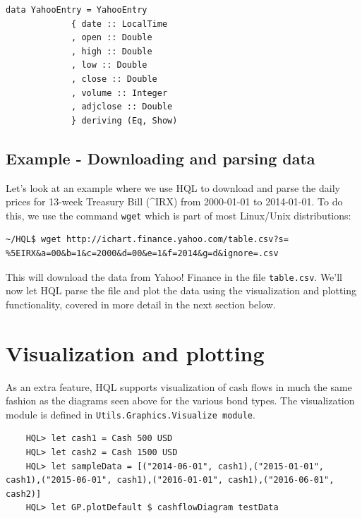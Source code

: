 \documentclass[11pt,a4paper]{article}
\numberwithin{equation}{section}
\begin{document}
        \begin{verbatim}
data YahooEntry = YahooEntry
             { date :: LocalTime
             , open :: Double
             , high :: Double
             , low :: Double
             , close :: Double
             , volume :: Integer
             , adjclose :: Double
             } deriving (Eq, Show)
        \end{verbatim}

        \subsection{Example - Downloading and parsing data}

        Let's look at an example where we use HQL to download and parse the daily prices for 13-week Treasury Bill (\string^{IRX}) from 2000-01-01 to 2014-01-01.
To do this, we use the command \texttt{wget} which is part of most Linux/Unix distributions:
        
        \begin{lstlisting}[breaklines=true]	
        ~/HQL$ wget http://ichart.finance.yahoo.com/table.csv?s= %5EIRX&a=00&b=1&c=2000&d=00&e=1&f=2014&g=d&ignore=.csv
	\end{lstlisting}

        This will download the data from Yahoo! Finance in the file \texttt{table.csv}. We'll now let HQL parse the file and plot the data using the
        visualization and plotting functionality, covered in more detail in the next section below.


	\section{Visualization and plotting}
	As an extra feature, HQL supports visualization of cash flows in much the same fashion as the diagrams seen above for the various bond types.
	The visualization module is defined in \texttt{Utils.Graphics.Visualize module}.

	\begin{lstlisting}	
	HQL> let cash1 = Cash 500 USD
	HQL> let cash2 = Cash 1500 USD
	HQL> let sampleData = [("2014-06-01", cash1),("2015-01-01", cash1),("2015-06-01", cash1),("2016-01-01", cash1),("2016-06-01", cash2)]
	HQL> let GP.plotDefault $ cashflowDiagram testData	
	\end{lstlisting}
\end{document}
